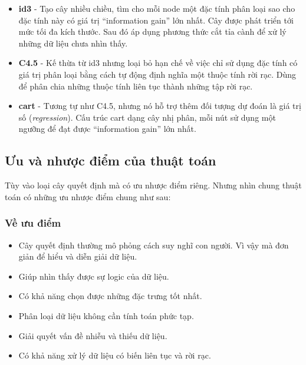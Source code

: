 \documentclass[../main-report.tex]{subfiles}
\begin{document}
\begin{itemize}
\item \textbf{\acrfull{id3}} - Tạo cây nhiều chiều, tìm cho mỗi node một đặc tính phân loại sao cho đặc tính này có giá trị ``information gain'' lớn nhất. Cây được phát triển tới mức tối đa kích thước. Sau đó áp dụng phương thức cắt tỉa cành để xử lý những dữ liệu chưa nhìn thấy.
\item \textbf{C4.5} - Kế thừa từ \acrshort{id3} nhưng loại bỏ hạn chế về việc chỉ sử dụng đặc tính có giá trị phân loại bằng cách tự động định nghĩa một thuộc tính rời rạc. Dùng để phân chia những thuộc tính liên tục thành những tập rời rạc.
\item \textbf{\acrfull{cart}} - Tương tự như C4.5, nhưng nó hỗ trợ thêm đối tượng dự đoán là giá trị số (\emph{\gls{regression}}). Cấu trúc \acrshort{cart} dạng cây nhị phân, mỗi nút sử dụng một ngưỡng để đạt được ``information gain'' lớn nhất.
\end{itemize}

%

\subsection{Ưu và nhược điểm của thuật toán}
Tùy vào loại cây quyết định mà có ưu nhược điểm riêng. Nhưng nhìn chung thuật toán có những ưu nhược điểm chung như sau:
\subsubsection*{Về ưu điểm}
\begin{itemize}
\item Cây quyết định thường mô phỏng cách suy nghĩ con người. Vì vậy mà đơn giản để hiểu và diễn giải dữ liệu.
\item Giúp nhìn thấy được sự logic của dữ liệu.
\item Có khả năng chọn được những đặc trưng tốt nhất.
\item Phân loại dữ liệu không cần tính toán phức tạp.
\item Giải quyết vấn đề nhiễu và thiếu dữ liệu.
\item Có khả năng xử lý dữ liệu có biến liên tục và rời rạc.
\end{itemize}
\end{document}
